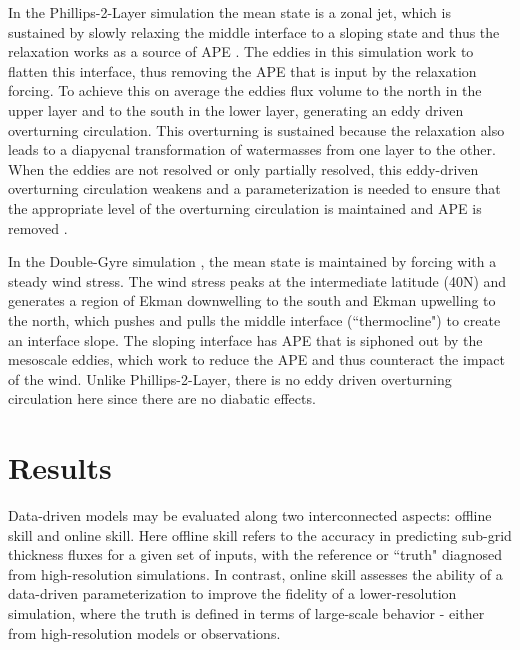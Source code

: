 \documentclass[draft]{agujournal2019}
\begin{document}
In the Phillips-2-Layer simulation the mean state is a zonal jet, which is sustained by slowly relaxing the middle interface to a sloping state and thus the relaxation works as a source of APE \cite{hallberg2013using}. 
The eddies in this simulation work to flatten this interface, thus removing the APE that is input by the relaxation forcing. To achieve this on average the eddies flux volume to the north in the upper layer and to the south in the lower layer, generating an eddy driven overturning circulation. This overturning is sustained because the relaxation also leads to a diapycnal transformation of watermasses from one layer to the other. 
When the eddies are not resolved or only partially resolved, this eddy-driven overturning circulation weakens and a parameterization is needed to ensure that the appropriate level of the overturning circulation is maintained and APE is removed \cite{hallberg2013using}. %

In the Double-Gyre simulation \cite{zhang2023implementation}, the mean state is maintained by forcing with a steady wind stress. The wind stress peaks at the intermediate latitude (40N) and generates a region of Ekman downwelling to the south and Ekman upwelling to the north, which pushes and pulls the middle interface (``thermocline") to create an interface slope. The sloping interface has APE that is siphoned out by the mesoscale eddies, which work to reduce the APE and thus counteract the impact of the wind. Unlike Phillips-2-Layer, there is no eddy driven overturning circulation here since there are no diabatic effects. %


\section{Results}
Data-driven models may be evaluated along two interconnected aspects: offline skill and online skill. Here offline skill refers to the accuracy in predicting sub-grid thickness fluxes for a given set of inputs, with the reference or ``truth" diagnosed from high-resolution simulations. In contrast, online skill assesses the ability of a data-driven parameterization to improve the fidelity of a lower-resolution simulation, where the truth is defined in terms of large-scale behavior - either from high-resolution models or observations.
\end{document}
